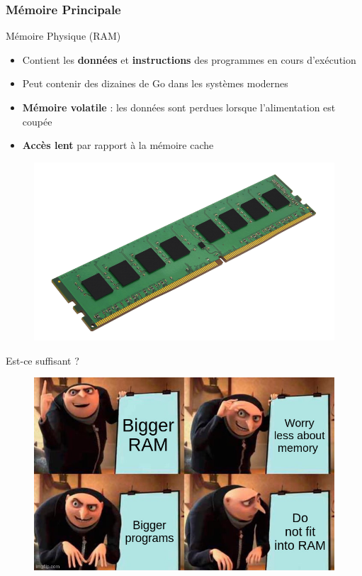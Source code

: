 \documentclass[8pt]{beamer}
\begin{document}
\begin{frame}
    \frametitle{Mémoire Principale}
    \begin{block}{Mémoire Physique (RAM)}
        \begin{itemize}
            \item Contient les \textbf{données} et \textbf{instructions} des
                  programmes en cours d'exécution
            \item Peut contenir des dizaines de Go dans les
                  systèmes modernes
            \item \textbf{Mémoire volatile} : les données sont perdues lorsque
                  l'alimentation est coupée
            \item \textbf{Accès lent} par rapport à la mémoire cache
        \end{itemize}
    \end{block}
    \begin{figure}
        \centering
        \includegraphics[width=.5\textwidth]{figures/DRAM.png}
    \end{figure}
\end{frame}

\begin{frame}{Est-ce suffisant ?}
    \begin{figure}
        \centering
        \includegraphics[width=.75\textwidth]{figures/RAM_meme.jpg}
    \end{figure}
\end{frame}
\end{document}
